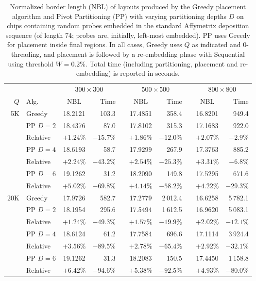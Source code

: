 \begin{table}[t!]\centering
\caption{\label{tab:pp_async_bl}
  Normalized border length (NBL) of layouts produced by the Greedy placement
  algorithm and Pivot Partitioning (PP) with varying partitioning depths $D$ on
  chips containing random probes embedded in the standard Affymetrix deposition
  sequence (of length 74; probes are, initially, left-most embedded). PP uses
  Greedy for placement inside final regions. In all cases, Greedy uses $Q$ as
  indicated and $0$-threading, and placement is followed by a re-embedding phase
  with Sequential using threshold $W=0.2\%$. Total time (including partitioning,
  placement and re-embedding) is reported in seconds.}
\footnotesize{
\begin{tabular}{rlcrlcrlcr}
\vspace{1pt}
 & & \multicolumn{2}{c}{$300\times 300$} & & \multicolumn{2}{c}{$500\times 500$} & & \multicolumn{2}{c}{$800\times 800$} \\
\cline{3-4} \cline{6-7} \cline{9-10}
\vspace{1pt}
$Q$ & Alg.     & NBL     & Time    & & NBL     & Time       & & NBL     & Time       \\
\hline
5K  & Greedy   & 18.2121 & 103.3   & & 17.4851 &    358.4   & & 16.8201 &    949.4   \\
\cline{2-10}
    & PP $D=2$ & 18.4376 &  87.0   & & 17.8102 &    315.3   & & 17.1683 &    922.0   \\
    & Relative &$+1.24\%$&$-15.7\%$& &$+1.86\%$&   $-12.0\%$& &$+2.07\%$&    $-2.9\%$\\
\cline{2-10}
    & PP $D=4$ & 18.6193 &  58.7   & & 17.9299 &    267.9   & & 17.3763 &    885.2   \\
    & Relative &$+2.24\%$&$-43.2\%$& &$+2.54\%$&   $-25.3\%$& &$+3.31\%$&    $-6.8\%$\\
\cline{2-10}
    & PP $D=6$ & 19.1262 &  31.2   & & 18.2090 &    149.8   & & 17.5295 &    671.6   \\
    & Relative &$+5.02\%$&$-69.8\%$& &$+4.14\%$&   $-58.2\%$& &$+4.22\%$&   $-29.3\%$\\
\hline
20K & Greedy   & 17.9726 & 582.7   & & 17.2779 & 2\,012.4   & & 16.6258 & 5\,782.1   \\
\cline{2-10}
    & PP $D=2$ & 18.1954 & 295.6   & & 17.5494 & 1\,612.5   & & 16.9620 & 5\,083.1   \\
    & Relative &$+1.24\%$&$-49.3\%$& &$+1.57\%$&   $-19.9\%$& &$+2.02\%$&   $-12.1\%$\\
\cline{2-10}
    & PP $D=4$ & 18.6124 &  61.2   & & 17.7584 &    696.6   & & 17.1114 & 3\,924.4   \\
    & Relative &$+3.56\%$&$-89.5\%$& &$+2.78\%$&   $-65.4\%$& &$+2.92\%$&   $-32.1\%$\\
\cline{2-10}
    & PP $D=6$ & 19.1262 &  31.3   & & 18.2083 &    150.5   & & 17.4450 & 1\,158.8   \\
    & Relative &$+6.42\%$&$-94.6\%$& &$+5.38\%$&   $-92.5\%$& &$+4.93\%$&   $-80.0\%$\\
\hline
\end{tabular}}
\end{table}

